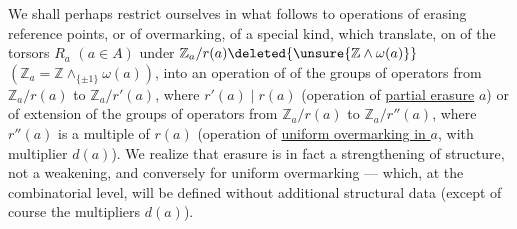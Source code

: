We shall perhaps restrict ourselves in what follows to operations of erasing reference points, or of overmarking, of a special kind, which translate, on  of the torsors $R_a$ $(a\in A)$  under
$\mathbb Z_a/r(a)\deleted{\unsure{\mathbb Z\mathbin{\wedge}\omega(a)}}$
$(\mathbb Z_a=\mathbb Z\mathbin{\wedge}_{\{\pm1\}}\omega(a))$,
into an operation of  of the groups of operators from $\mathbb Z_a/r(a)$ to $\mathbb Z_a/r'(a)$, where $r'(a)\mid r(a)$
(operation of  \uline{partial erasure}  $a$)
or of extension of the groups of operators from $\mathbb Z_a/r(a)$ to $\mathbb Z_a/r''(a)$, where $r''(a)$  is a multiple of $r(a)$
(operation of \uline{uniform overmarking in $a$}, \deleted{)} with multiplier $d(a)$).
We realize  that  erasure is in fact a strengthening of structure, not a weakening, and conversely for uniform overmarking --- which, at the combinatorial level, will be defined without additional structural data (except of course the multipliers $d(a)$).
